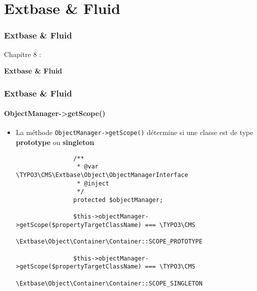 %

\section{Extbase \& Fluid}
\begin{frame}[fragile]
	\frametitle{Extbase \& Fluid}

	\begin{center}\huge{Chapitre 8 :}\end{center}
	\begin{center}\huge{\color{typo3darkgrey}\textbf{Extbase \& Fluid}}\end{center}

\end{frame}


\begin{frame}[fragile]
	\frametitle{Extbase \& Fluid}
	\framesubtitle{ObjectManager->getScope()}

	\lstset{
		basicstyle=\tiny\ttfamily
	}

	\begin{itemize}
		\item La méthode \texttt{ObjectManager->getScope()} détermine si une classe est de type \textbf{prototype} ou \textbf{singleton}

			\begin{lstlisting}
				/**
				 * @var \TYPO3\CMS\Extbase\Object\ObjectManagerInterface
				 * @inject
				 */
				protected $objectManager;

				$this->objectManager->getScope($propertyTargetClassName) === \TYPO3\CMS
				\Extbase\Object\Container\Container::SCOPE_PROTOTYPE

				$this->objectManager->getScope($propertyTargetClassName) === \TYPO3\CMS
				\Extbase\Object\Container\Container::SCOPE_SINGLETON
			\end{lstlisting}

	\end{itemize}

\end{frame}

